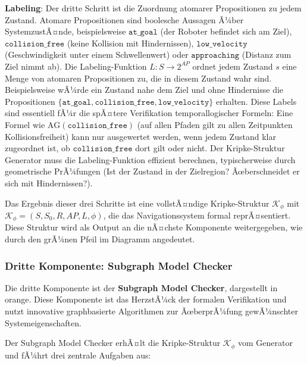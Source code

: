 ﻿\documentclass[a4paper,12pt]{article}
\theoremstyle{definition}
\begin{document}
\textbf{Labeling}: Der dritte Schritt ist die Zuordnung atomarer Propositionen zu jedem Zustand. Atomare Propositionen sind boolesche Aussagen Ã¼ber SystemzustÃ¤nde, beispielsweise $\texttt{at\_goal}$ (der Roboter befindet sich am Ziel), $\texttt{collision\_free}$ (keine Kollision mit Hindernissen), $\texttt{low\_velocity}$ (Geschwindigkeit unter einem Schwellenwert) oder $\texttt{approaching}$ (Distanz zum Ziel nimmt ab). Die Labeling-Funktion $L: S \to 2^{AP}$ ordnet jedem Zustand $s$ eine Menge von atomaren Propositionen zu, die in diesem Zustand wahr sind. Beispielsweise wÃ¼rde ein Zustand nahe dem Ziel und ohne Hindernisse die Propositionen $\{\texttt{at\_goal}, \texttt{collision\_free}, \texttt{low\_velocity}\}$ erhalten. Diese Labels sind essentiell fÃ¼r die spÃ¤tere Verifikation temporallogischer Formeln: Eine Formel wie $\text{AG}(\texttt{collision\_free})$ (auf allen Pfaden gilt zu allen Zeitpunkten Kollisionsfreiheit) kann nur ausgewertet werden, wenn jedem Zustand klar zugeordnet ist, ob $\texttt{collision\_free}$ dort gilt oder nicht. Der Kripke-Struktur Generator muss die Labeling-Funktion effizient berechnen, typischerweise durch geometrische PrÃ¼fungen (Ist der Zustand in der Zielregion? Ãœberschneidet er sich mit Hindernissen?).

Das Ergebnis dieser drei Schritte ist eine vollstÃ¤ndige Kripke-Struktur $\mathcal{K}_\phi$ mit $\mathcal{K}_\phi = (S, S_0, R, AP, L, \phi)$, die das Navigationssystem formal reprÃ¤sentiert. Diese Struktur wird als Output an die nÃ¤chste Komponente weitergegeben, wie durch den grÃ¼nen Pfeil im Diagramm angedeutet.

\subsubsection{Dritte Komponente: Subgraph Model Checker}

Die dritte Komponente ist der \textbf{Subgraph Model Checker}, dargestellt in orange. Diese Komponente ist das HerzstÃ¼ck der formalen Verifikation und nutzt innovative graphbasierte Algorithmen zur ÃœberprÃ¼fung gewÃ¼nschter Systemeigenschaften.

Der Subgraph Model Checker erhÃ¤lt die Kripke-Struktur $\mathcal{K}_\phi$ vom Generator und fÃ¼hrt drei zentrale Aufgaben aus:
\end{document}
